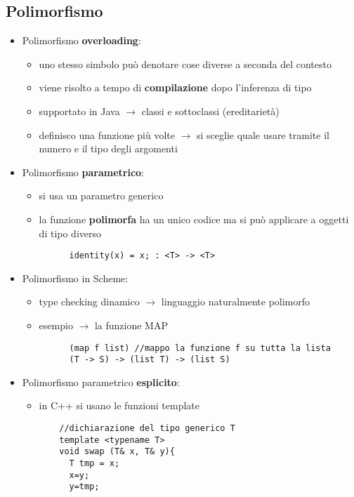 \documentclass[12pt]{extarticle}
\begin{document}
\begin{flushleft}
\section*{Polimorfismo}
\begin{itemize}
  \item Polimorfismo \textbf{overloading}:
  \begin{itemize}
    \item uno stesso simbolo può denotare cose diverse a seconda del contesto
    \item viene risolto a tempo di \textbf{compilazione} dopo l'inferenza di tipo
    \item supportato in Java $\rightarrow$ classi e sottoclassi (ereditarietà)
    \item definisco una funzione più volte $\rightarrow$ si sceglie quale usare tramite il numero e il tipo degli argomenti
  \end{itemize}
  \item Polimorfismo \textbf{parametrico}:
  \begin{itemize}
    \item si usa un parametro generico 
    \item la funzione \textbf{polimorfa} ha un unico codice ma si può applicare a oggetti di tipo diverso
    \begin{lstlisting}
      identity(x) = x; : <T> -> <T>
    \end{lstlisting}
  \end{itemize}
  \item Polimorfismo in Scheme:
  \begin{itemize}
    \item type checking dinamico $\rightarrow$ linguaggio naturalmente polimorfo
    \item esempio $\rightarrow$ la funzione MAP
    \begin{lstlisting}
      (map f list) //mappo la funzione f su tutta la lista
      (T -> S) -> (list T) -> (list S)
    \end{lstlisting}
  \end{itemize}
  \newpage
  \item Polimorfismo parametrico \textbf{esplicito}:
  \begin{itemize}
    \item in C++ si usano le funzioni template
  \begin{lstlisting}
    //dichiarazione del tipo generico T
    template <typename T>
    void swap (T& x, T& y){
      T tmp = x; 
      x=y; 
      y=tmp;

\end{lstlisting}
\end{itemize}
\end{itemize}
\end{flushleft}
\end{document}
